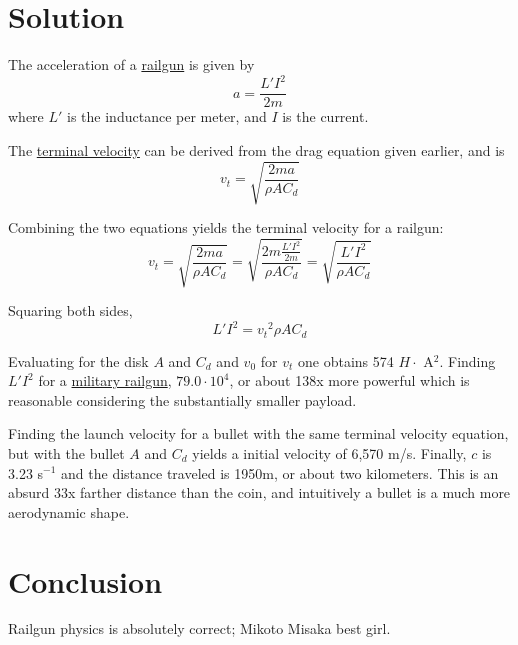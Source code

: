 \documentclass[11pt, oneside]{article}
\begin{document}
\section{Solution}

The acceleration of a \href{https://en.wikipedia.org/wiki/Railgun}{railgun} 
is given by 
\[ a = \frac{L' I^2}{2m} \] 
where \( L' \) is the inductance per meter, and \( I \) is the current.

The \href{https://en.wikipedia.org/wiki/Terminal_velocity}{terminal velocity}
can be derived from the drag equation given earlier, and is 
\[ v_t = \sqrt{\frac{2ma}{\rho A C_d}} \]

Combining the two equations yields the terminal velocity for a railgun:
\[ v_t = \sqrt{\frac{2ma}{\rho A C_d}} 
       = \sqrt{\frac{2m\frac{L' I^2}{2m}}{\rho A C_d}} 
       = \sqrt{\frac{L' I^2}{\rho A C_d}} \]

Squaring both sides, 
\[ L' I^2 =  {v_t}^2 \rho A C_d \]

Evaluating for the disk \( A \) and \( C_d \) and \( v_0 \) for \( v_t \)
one obtains 574 \(  H \cdot \) A\(^2\). 
Finding \( L' I^2 \) for a 
\href{https://apps.dtic.mil/dtic/tr/fulltext/u2/a253366.pdf}{military railgun},
\( 79.0 \cdot 10^4 \), or about 138x more powerful which is reasonable
considering the substantially smaller payload.

Finding the launch velocity for a bullet with the same terminal velocity 
equation, but with the bullet \( A \) and \( C_d \) yields a initial velocity
of 6,570 m/s. Finally, \( c \) is 3.23 s\(^{-1}\) and
the distance traveled is 1950m, or about two kilometers. 
This is an absurd 33x farther distance than the coin, 
and intuitively a bullet is a much more aerodynamic shape.

\section{Conclusion}

Railgun physics is absolutely correct; Mikoto Misaka best girl. \\

\printbibliography
\end{document}

